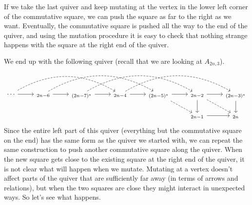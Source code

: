\documentclass[12pt, dvipsnames, oneside]{amsart}
\theoremstyle{definition}
\begin{document}
If we take the last quiver and keep mutating at the vertex in the lower left corner of the commutative square, we can push the square as far to the right as we want.
Eventually, the commutative square is pushed all the way to the end of the quiver, and using the mutation procedure it is easy to check that nothing strange happens with the square at the right end of the quiver. 

We end up with the following quiver (recall that we are looking at $A_{2n,3}$).
\begin{equation*}
\begin{tikzcd}
\cdots \arrow[r] \arrow[rrr, bend left,  dashed]  & _{2n-6} \arrow[r] \arrow[rrr, bend left, dashed] & _{(2n-7)^*} \arrow[r] \arrow[rrr, bend left, dashed] & _{2n-4} \arrow[r] \arrow[rrr, bend left, dashed] & _{(2n-5)^*} \arrow[r] \arrow[dr, dashed] & _{2n-2} \arrow[d] \arrow[r] \arrow[dr, dashed] & _{(2n-3)^*} \arrow[d] \\
& & & & & _{2n-1} \arrow[r] & _{2n} 
\end{tikzcd}
\end{equation*}
Since the entire left part of this quiver (everything but the commutative square on the end) has the same form as the quiver we started with, we can repeat the same construction to push another commutative square along the quiver. When the new square gets close to the existing square at the right end of the quiver, it is not clear what will happen when we mutate. Mutating at a vertex doesn't affect parts of the quiver that are sufficiently far away (in terms of arrows and relations), but when the two squares are close they might interact in unexpected ways. 
So let's see what happens. 
\end{document}
